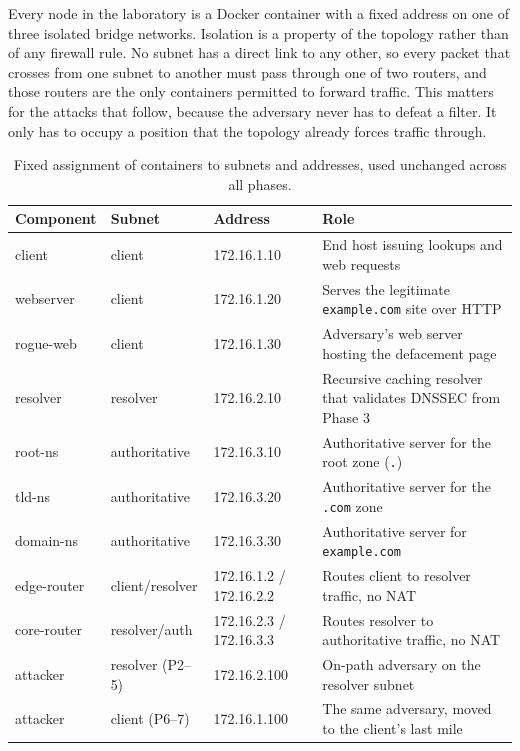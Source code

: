 \documentclass[11pt]{article}
\begin{document}
Every node in the laboratory is a Docker container with a fixed address on one of
three isolated bridge networks. Isolation is a property of the topology rather
than of any firewall rule. No subnet has a direct link to any other, so every
packet that crosses from one subnet to another must pass through one of two
routers, and those routers are the only containers permitted to forward traffic.
This matters for the attacks that follow, because the adversary never has to
defeat a filter. It only has to occupy a position that the topology already
forces traffic through.

\begin{table}[H]
\centering
\small
\begin{tabularx}{\linewidth}{l l l Y}
\toprule
\textbf{Component} & \textbf{Subnet} & \textbf{Address} & \textbf{Role} \\
\midrule
client      & client        & 172.16.1.10  & End host issuing lookups and web requests \\
webserver   & client        & 172.16.1.20  & Serves the legitimate \texttt{example.com} site over HTTP \\
rogue-web   & client        & 172.16.1.30  & Adversary's web server hosting the defacement page \\
resolver    & resolver      & 172.16.2.10  & Recursive caching resolver that validates DNSSEC from Phase 3 \\
root-ns     & authoritative & 172.16.3.10  & Authoritative server for the root zone (\texttt{.}) \\
tld-ns      & authoritative & 172.16.3.20  & Authoritative server for the \texttt{.com} zone \\
domain-ns   & authoritative & 172.16.3.30  & Authoritative server for \texttt{example.com} \\
edge-router & client/resolver & 172.16.1.2 / 172.16.2.2 & Routes client to resolver traffic, no NAT \\
core-router & resolver/auth   & 172.16.2.3 / 172.16.3.3 & Routes resolver to authoritative traffic, no NAT \\
attacker    & resolver (P2--5) & 172.16.2.100 & On-path adversary on the resolver subnet \\
attacker    & client (P6--7)   & 172.16.1.100 & The same adversary, moved to the client's last mile \\
\bottomrule
\end{tabularx}
\caption{Fixed assignment of containers to subnets and addresses, used unchanged across all phases.}
\label{tab:components}
\end{table}
\end{document}
